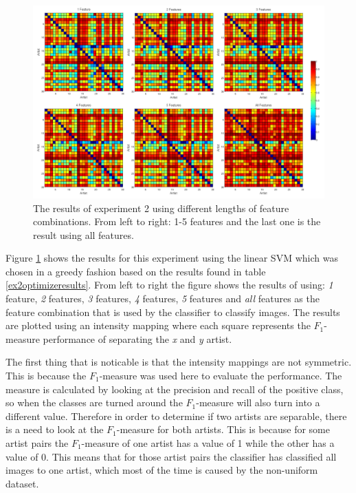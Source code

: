 \begin{figure}[htb]
  \centering
  \includegraphics[width=1\linewidth]{img/experiment2results.png}
  \caption{The results of experiment 2 using different lengths of feature combinations. From left to right: 1-5 features and the last one is the result using all features.}
  \label{fig:experiment2results}
\end{figure}

Figure \ref{fig:experiment2results} shows the results for this experiment using the linear SVM which was chosen in a greedy fashion based on the results found in table \ref{ex2optimizeresults}.
From left to right the figure shows the results of using: \textit{1} feature, \textit{2} features, \textit{3} features, \textit{4} features, \textit{5} features and \textit{all} features as the feature combination that is used by the classifier to classify images.
The results are plotted using an intensity mapping where each square represents the $F_1$-measure performance of separating the \textit{x} and \textit{y} artist.

The first thing that is noticable is that the intensity mappings are not symmetric.
This is because the $F_1$-measure was used here to evaluate the performance.
The measure is calculated by looking at the precision and recall of the positive class, so when the classes are turned around the $F_1$-measure will also turn into a different value.
Therefore in order to determine if two artists are separable, there is a need to look at the $F_1$-measure for both artists.
This is because for some artist pairs the $F_1$-measure of one artist has a value of 1 while the other has a value of 0.
This means that for those artist pairs the classifier has classified all images to one artist, which most of the time is caused by the non-uniform dataset.

